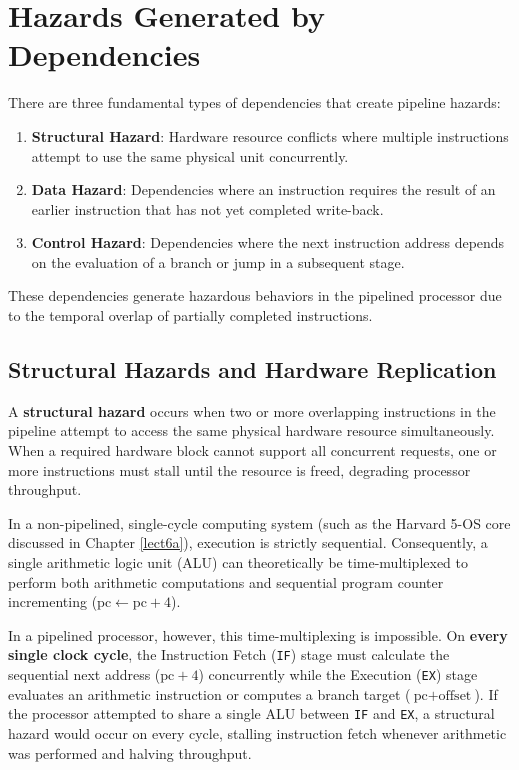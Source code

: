 \section{Hazards Generated by Dependencies}

There are three fundamental types of dependencies that create pipeline hazards:
\begin{enumerate}
\item \textbf{Structural Hazard}: Hardware resource conflicts where multiple instructions attempt to use the same physical unit concurrently.
\item \textbf{Data Hazard}: Dependencies where an instruction requires the result of an earlier instruction that has not yet completed write-back.
\item \textbf{Control Hazard}: Dependencies where the next instruction address depends on the evaluation of a branch or jump in a subsequent stage.
\end{enumerate}

These dependencies generate hazardous behaviors in the pipelined processor due to the temporal overlap of partially completed instructions.

\subsection{Structural Hazards and Hardware Replication}\label{sec:structural_hazards}

A \textbf{structural hazard} occurs when two or more overlapping instructions in the pipeline attempt to access the same physical hardware resource simultaneously. When a required hardware block cannot support all concurrent requests, one or more instructions must stall until the resource is freed, degrading processor throughput.

In a non-pipelined, single-cycle computing system (such as the Harvard 5-OS core discussed in Chapter \ref{lect6a}), execution is strictly sequential. Consequently, a single arithmetic logic unit (ALU) can theoretically be time-multiplexed to perform both arithmetic computations and sequential program counter incrementing ($\text{pc} \leftarrow \text{pc} + 4$).

In a pipelined processor, however, this time-multiplexing is impossible. On \textbf{every single clock cycle}, the Instruction Fetch (\texttt{IF}) stage must calculate the sequential next address ($\text{pc} + 4$) concurrently while the Execution (\texttt{EX}) stage evaluates an arithmetic instruction or computes a branch target ($\text{pc} + \text{offset}$). If the processor attempted to share a single ALU between \texttt{IF} and \texttt{EX}, a structural hazard would occur on every cycle, stalling instruction fetch whenever arithmetic was performed and halving throughput.

